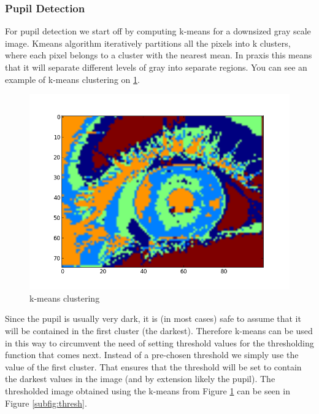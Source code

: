 \subsubsection{Pupil Detection}
For pupil detection we start off by computing k-means for a downsized gray scale image. Kmeans algorithm iteratively partitions all the pixels into k clusters, where each pixel belongs to a cluster with the nearest mean. In praxis this means that it will separate different levels of gray into separate regions. You can see an example of k-means clustering on  \ref{fig:kmeans}.

\begin{figure}[h!]
\centering
\includegraphics[width=\columnwidth]{final/images/k-means.png}
\caption{k-means clustering}
\label{fig:kmeans}
\end{figure}

Since the pupil is usually very dark, it is (in most cases) safe to assume that it will be contained in the first cluster (the darkest). Therefore k-means can be used in this way to circumvent the need of setting threshold values for the thresholding function that comes next. Instead of a pre-chosen threshold we simply use the value of the first cluster. That ensures that the threshold will be set to contain the darkest values in the image (and by extension likely the pupil). The thresholded image obtained using the k-means from Figure \ref{fig:kmeans} can be seen in Figure \ref{subfig:thresh}. 

